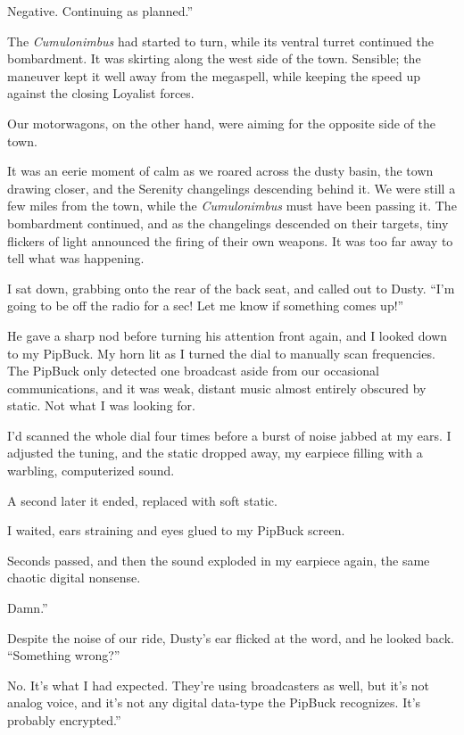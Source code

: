 \leavevmode{}Negative. Continuing as planned.”

The \textit{Cumulonimbus} had started to turn, while its ventral turret continued the bombardment. It was skirting along the west side of the town. Sensible; the maneuver kept it well away from the megaspell, while keeping the speed up against the closing Loyalist forces.

Our motorwagons, on the other hand, were aiming for the opposite side of the town.

It was an eerie moment of calm as we roared across the dusty basin, the town drawing closer, and the Serenity changelings descending behind it. We were still a few miles from the town, while the \textit{Cumulonimbus} must have been passing it. The bombardment continued, and as the changelings descended on their targets, tiny flickers of light announced the firing of their own weapons. It was too far away to tell what was happening.

I sat down, grabbing onto the rear of the back seat, and called out to Dusty. “I’m going to be off the radio for a sec! Let me know if something comes up!”

He gave a sharp nod before turning his attention front again, and I looked down to my PipBuck. My horn lit as I turned the dial to manually scan frequencies. The PipBuck only detected one broadcast aside from our occasional communications, and it was weak, distant music almost entirely obscured by static. Not what I was looking for.

I’d scanned the whole dial four times before a burst of noise jabbed at my ears. I adjusted the tuning, and the static dropped away, my earpiece filling with a warbling, computerized sound.

A second later it ended, replaced with soft static.

I waited, ears straining and eyes glued to my PipBuck screen.

Seconds passed, and then the sound exploded in my earpiece again, the same chaotic digital nonsense.

\leavevmode{}Damn.”

Despite the noise of our ride, Dusty’s ear flicked at the word, and he looked back. “Something wrong?”

\leavevmode{}No. It’s what I had expected. They’re using broadcasters as well, but it’s not analog voice, and it’s not any digital data-type the PipBuck recognizes. It’s probably encrypted.”

